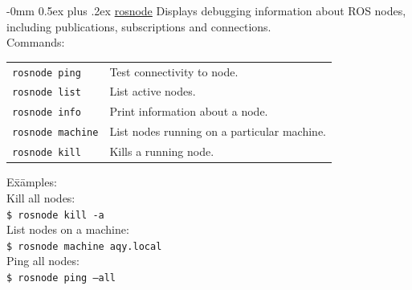 \documentclass[10pt,landscape]{article}
\makeatletter
\renewcommand{\subsection}{\@startsection{subsection}{2}{0mm}%
                                {-0mm}%
                                {0.5ex plus .2ex}%
                                {\normalfont\normalsize\bfseries}}
\makeatother
\begin{document}
\begin{multicols}{3}
\vspace{-2.5 mm}
\subsection{\href{http://wiki.ros.org/rosnode}{rosnode}}
Displays debugging information about ROS nodes, including publications, subscriptions and connections.\\
\vspace{2.5 mm}
Commands: \\
\begin{tabular}{@{}p{\the\MyLen}%
                @{}p{\linewidth-\the\MyLen}@{}}
\texttt{rosnode ping}    & Test connectivity to node. \\
\texttt{rosnode list}    & List active nodes. \\
\texttt{rosnode info}    & Print information about a node. \\
\texttt{rosnode machine} & List nodes running on a particular machine. \\
\texttt{rosnode kill}    & Kills a running node.
\end{tabular}
\begin{tabbing}
E\=x\=amples:\\
\> Kill all nodes:\\
\> \> \texttt{\$ rosnode kill -a}\\
\> List nodes on a machine:\\
\> \> \texttt{\$ rosnode machine aqy.local}\\
\> Ping all nodes:\\
\> \> \texttt{\$ rosnode ping --all}
\end{tabbing}


\vspace{-2.5 mm}

\end{multicols}
\end{document}
